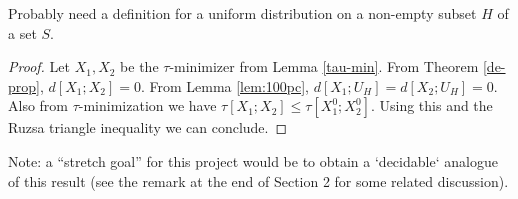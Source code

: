 Probably need a definition for a uniform distribution on a non-empty subset $H$ of a set $S$.

\begin{proof}   Let $X_1, X_2$ be the $\tau$-minimizer from Lemma \ref{tau-min}.  From Theorem \ref{de-prop}, $d[X_1;X_2]=0$.  From Lemma \ref{lem:100pc}, $d[X_1;U_H] = d[X_2; U_H] = 0$.  Also from $\tau$-minimization we have $\tau[X_1;X_2] \leq \tau[X^0_1;X^0_2]$.  Using this and the Ruzsa triangle inequality we can conclude.
\end{proof}

Note: a ``stretch goal'' for this project would be to obtain a `decidable` analogue of this result (see the remark at the end of Section 2 for some related discussion).
